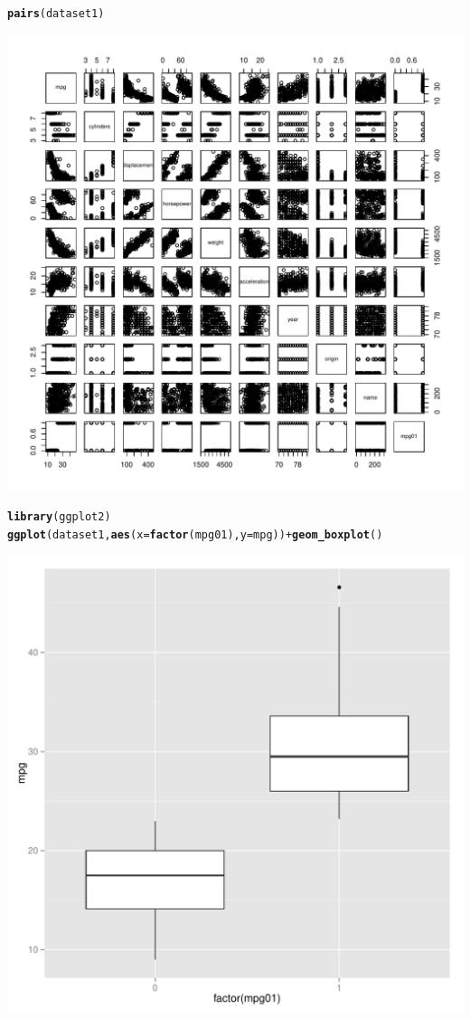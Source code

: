 \documentclass{article}\usepackage[]{graphicx}\usepackage[]{color}
\makeatletter
\def\maxwidth{ %
  \ifdim\Gin@nat@width>\linewidth
    \linewidth
  \else
    \Gin@nat@width
  \fi
}
\newcommand{\hlopt}[1]{\textcolor[rgb]{0,0,0}{#1}}%
\newcommand{\hlstd}[1]{\textcolor[rgb]{0.345,0.345,0.345}{#1}}%
\newcommand{\hlkwc}[1]{\textcolor[rgb]{0.333,0.667,0.333}{#1}}%
\newcommand{\hlkwd}[1]{\textcolor[rgb]{0.737,0.353,0.396}{\textbf{#1}}}%
\newenvironment{kframe}{%
 \def\at@end@of@kframe{}%
 \ifinner\ifhmode%
  \def\at@end@of@kframe{\end{minipage}}%
  \begin{minipage}{\columnwidth}%
 \fi\fi%
 \def\FrameCommand##1{\hskip\@totalleftmargin \hskip-\fboxsep
 \colorbox{shadecolor}{##1}\hskip-\fboxsep
     \hskip-\linewidth \hskip-\@totalleftmargin \hskip\columnwidth}%
 \MakeFramed {\advance\hsize-\width
   \@totalleftmargin\z@ \linewidth\hsize
   \@setminipage}}%
 {\par\unskip\endMakeFramed%
 \at@end@of@kframe}
\newenvironment{knitrout}{}{} %
\makeatother
\begin{document}
\begin{enumerate}[(a)]
\begin{knitrout}
\begin{kframe}
{\ttfamily\noindent\bfseries\color{errorcolor}{\#\# Error in cor(dataset2): 'x' must be numeric}}\begin{alltt}
\hlkwd{pairs}\hlstd{(dataset1)}
\end{alltt}
\end{kframe}
\includegraphics[width=\maxwidth]{figure/unnamed-chunk-7-1} 
\begin{kframe}\begin{alltt}
\hlkwd{library}\hlstd{(ggplot2)}
\hlkwd{ggplot}\hlstd{(dataset1,} \hlkwd{aes}\hlstd{(}\hlkwc{x}\hlstd{=}\hlkwd{factor}\hlstd{(mpg01),} \hlkwc{y}\hlstd{=mpg))}\hlopt{+}\hlkwd{geom_boxplot}\hlstd{()}
\end{alltt}
\end{kframe}
\includegraphics[width=\maxwidth]{figure/unnamed-chunk-7-2} 

\end{knitrout}
\end{enumerate}
\end{document}
